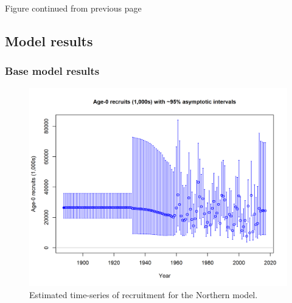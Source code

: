 \documentclass[12pt,]{article}
\begin{document}
\begin{center} 

            Figure continued from previous page 

            \end{center}

\FloatBarrier

\newpage

\subsection{Model results}\label{model-results}

\subsubsection{Base model results}\label{base-model-results}

\begin{figure}[htbp]
\centering
\includegraphics{r4ss/plots_mod1/ts11_Age-0_recruits_(1000s)_with_95_asymptotic_intervals.png}
\caption{Estimated time-series of recruitment for the Northern model.
\label{fig:recruits1}}
\end{figure}
\end{document}

